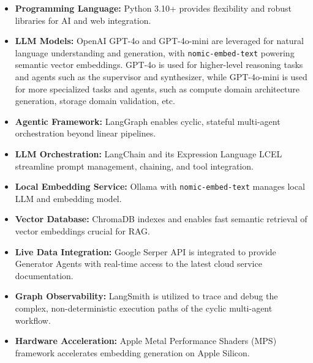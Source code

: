 \begin{itemize}
    \item \textbf{Programming Language:} Python 3.10+ provides flexibility and robust libraries for AI and web integration.
    \item \textbf{LLM Models:} OpenAI GPT-4o and GPT-4o-mini are leveraged for natural language understanding and generation, with \texttt{nomic-embed-text} powering semantic vector embeddings. GPT-4o is used for higher-level reasoning tasks and agents such as the supervisor and synthesizer, while GPT-4o-mini is used for more specialized tasks and agents, such as compute domain architecture generation, storage domain validation, etc.
    \item \textbf{Agentic Framework:} LangGraph \cite{langgraph2024docs} enables cyclic, stateful multi-agent orchestration beyond linear pipelines.
    \item \textbf{LLM Orchestration:} LangChain \cite{langchain2024docs} and its Expression Language LCEL \cite{langchain2024lcel} streamline prompt management, chaining, and tool integration.
    \item \textbf{Local Embedding Service:} Ollama \cite{ollama2024web} with \texttt{nomic-embed-text} manages local LLM and embedding model.
    \item \textbf{Vector Database:} ChromaDB \cite{chromadb2024} indexes and enables fast semantic retrieval of vector embeddings crucial for RAG.
    \item \textbf{Live Data Integration:} Google Serper API is integrated to provide Generator Agents with real-time access to the latest cloud service documentation.
    \item \textbf{Graph Observability:} LangSmith is utilized to trace and debug the complex, non-deterministic execution paths of the cyclic multi-agent workflow.
    \item \textbf{Hardware Acceleration:} Apple Metal Performance Shaders (MPS) framework \cite{apple2024mps} accelerates embedding generation on Apple Silicon.
\end{itemize}

